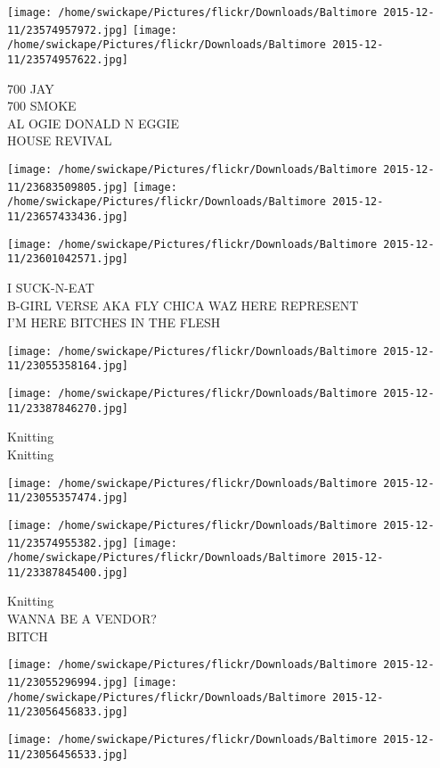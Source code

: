 \documentclass[10pt,letterpaper]{article}
\begin{document}
\texttt{[image: /home/swickape/Pictures/flickr/Downloads/Baltimore 2015-12-11/23574957972.jpg]}
\texttt{[image: /home/swickape/Pictures/flickr/Downloads/Baltimore 2015-12-11/23574957622.jpg]}

700 JAY\\
700 SMOKE\\
AL OGIE DONALD N EGGIE\\
HOUSE REVIVAL
\pagebreak

\texttt{[image: /home/swickape/Pictures/flickr/Downloads/Baltimore 2015-12-11/23683509805.jpg]}
\texttt{[image: /home/swickape/Pictures/flickr/Downloads/Baltimore 2015-12-11/23657433436.jpg]}

\texttt{[image: /home/swickape/Pictures/flickr/Downloads/Baltimore 2015-12-11/23601042571.jpg]}

I SUCK{-}N{-}EAT\\
B{-}GIRL VERSE AKA FLY CHICA WAZ HERE REPRESENT\\
I'M HERE BITCHES IN THE FLESH
\pagebreak

\texttt{[image: /home/swickape/Pictures/flickr/Downloads/Baltimore 2015-12-11/23055358164.jpg]}

\vspace{0.25in}
\texttt{[image: /home/swickape/Pictures/flickr/Downloads/Baltimore 2015-12-11/23387846270.jpg]}

Knitting\\
Knitting
\pagebreak

\texttt{[image: /home/swickape/Pictures/flickr/Downloads/Baltimore 2015-12-11/23055357474.jpg]}

\vspace{0.25in}
\texttt{[image: /home/swickape/Pictures/flickr/Downloads/Baltimore 2015-12-11/23574955382.jpg]}
\texttt{[image: /home/swickape/Pictures/flickr/Downloads/Baltimore 2015-12-11/23387845400.jpg]}

Knitting\\
WANNA BE A VENDOR?\\
BITCH
\pagebreak

\texttt{[image: /home/swickape/Pictures/flickr/Downloads/Baltimore 2015-12-11/23055296994.jpg]}
\texttt{[image: /home/swickape/Pictures/flickr/Downloads/Baltimore 2015-12-11/23056456833.jpg]}

\texttt{[image: /home/swickape/Pictures/flickr/Downloads/Baltimore 2015-12-11/23056456533.jpg]}
\end{document}
